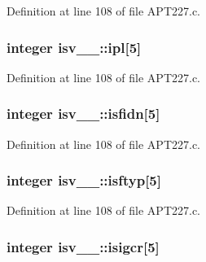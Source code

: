 Definition at line 108 of file A\+P\+T227.\+c.

\subsubsection[{\texorpdfstring{ipl}{ipl}}]{\setlength{\rightskip}{0pt plus 5cm}integer isv\+\_\+\_\+\+::ipl\mbox{[}5\mbox{]}}\hypertarget{structisv__1___a47696a386fd37002d15054e348f709d2}{}\label{structisv__1___a47696a386fd37002d15054e348f709d2}


Definition at line 108 of file A\+P\+T227.\+c.

\subsubsection[{\texorpdfstring{isfidn}{isfidn}}]{\setlength{\rightskip}{0pt plus 5cm}integer isv\+\_\+\_\+\+::isfidn\mbox{[}5\mbox{]}}\hypertarget{structisv__1___a20d9b0a1caec9e6e55c4392888cc85b2}{}\label{structisv__1___a20d9b0a1caec9e6e55c4392888cc85b2}


Definition at line 108 of file A\+P\+T227.\+c.

\subsubsection[{\texorpdfstring{isftyp}{isftyp}}]{\setlength{\rightskip}{0pt plus 5cm}integer isv\+\_\+\_\+\+::isftyp\mbox{[}5\mbox{]}}\hypertarget{structisv__1___a95d67e7bab2248a8a3d7efb192a13e45}{}\label{structisv__1___a95d67e7bab2248a8a3d7efb192a13e45}


Definition at line 108 of file A\+P\+T227.\+c.

\subsubsection[{\texorpdfstring{isigcr}{isigcr}}]{\setlength{\rightskip}{0pt plus 5cm}integer isv\+\_\+\_\+\+::isigcr\mbox{[}5\mbox{]}}\hypertarget{structisv__1___af1060d057ba92173dab9ffa6385a9a4b}{}\label{structisv__1___af1060d057ba92173dab9ffa6385a9a4b}


